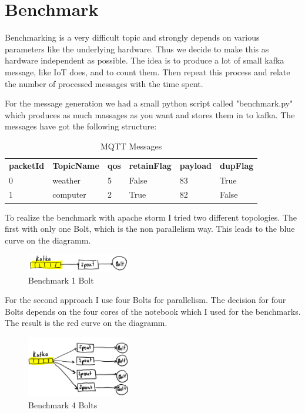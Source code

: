 \newpage
\section{Benchmark}

Benchmarking is a very difficult topic and strongly depends on various parameters like the underlying hardware.
Thus we decide to make this as hardware independent as possible.
The idea is to produce a lot of small kafka message, like IoT does,
and to count them. Then repeat this process and relate the number of processed messages with the time spent.

For the message generation we had a small python script called "benchmark.py" which produces as much massages as you want
and stores them in to kafka.
The messages have got the following structure:

\begin{table}[h!]
 \centering
 \begin{tabular}{llllll}
   \textbf{packetId}  & \textbf{TopicName} & \textbf{qos} & \textbf{retainFlag} & \textbf{payload} & \textbf{dupFlag} \\
   0 & weather & 5 & False & 83 & True \\
   1 & computer & 2 & True & 82 & False \\
 \end{tabular}
 \caption{MQTT Messages}
 \label{tab:messages}
\end{table}

To realize the benchmark with apache storm I tried two different topologies.
The first with only one Bolt, which is the non parallelism way. This leads to the blue curve on the diagramm.
\begin{figure}[H]
\centering
\captionsetup{justification=centering}
\includegraphics[width=0.4\textwidth]{images/benchmark_topic1.png}
\caption[Benchmark 1 Bolt]{Benchmark 1 Bolt}
\end{figure}

For the second approach I use four Bolts for parallelism.
The decision for four Bolts depends on the four cores of the notebook which I used for the benchmarks.
The result is the red curve on the diagramm.

\begin{figure}[H]
\centering
\captionsetup{justification=centering}
\includegraphics[width=0.4\textwidth]{images/benchmark_topic2.png}
\caption[Benchmark 4 Bolts]{Benchmark 4 Bolts}
\end{figure}



